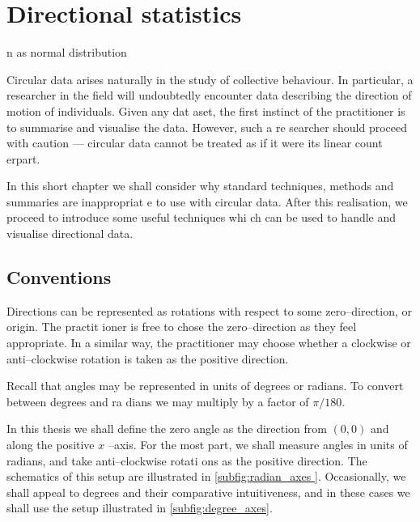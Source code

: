 \graphicspath{{fig/circ_stats_intro/}}

\chapter{Directional statistics}	
\label{cha:direct_stats}

n as normal distribution

Circular data arises naturally in the study of collective behaviour. In particular, a researcher in the
 field will undoubtedly encounter data describing the direction of motion of individuals. Given any dat
aset, the first instinct of the practitioner is to summarise and visualise the data. However, such a re
searcher should proceed with caution --- circular data cannot be treated as if it were its linear count
erpart.

In this short chapter we shall consider why standard techniques, methods and summaries are inappropriat
e to use with circular data. After this realisation, we proceed to introduce some useful techniques whi
ch can be used to handle and visualise directional data.

\section{Conventions}
\label{sec:conventions}

Directions can be represented as rotations with respect to some zero--direction, or origin. The practit
ioner is free to chose the zero--direction as they feel appropriate. In a similar way, the practitioner
 may choose whether a clockwise or anti--clockwise rotation is taken as the positive direction.

Recall that angles may be represented in units of degrees or radians. To convert between degrees and ra
dians we may multiply by a factor of $\pi/180$\textdegree.

In this thesis we shall define the zero angle as the direction from $(0, 0)$ and along the positive $x$
--axis. For the most part, we shall measure angles in units of radians, and take anti--clockwise rotati
ons as the positive direction. The schematics of this setup are illustrated in \cref{subfig:radian_axes
}. Occasionally, we shall appeal to degrees and their comparative intuitiveness, and in these cases we 
shall use the setup illustrated in  \cref{subfig:degree_axes}.

